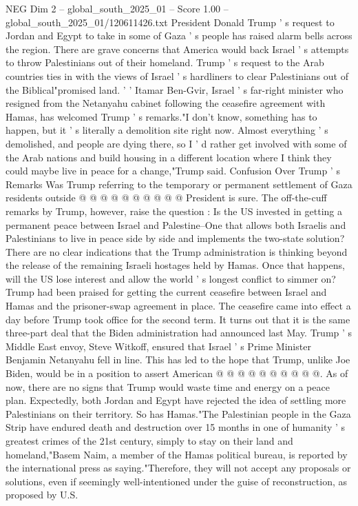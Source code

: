 \begin{textsample}{NEG Dim 2 – global\_south\_2025\_01 – Score 1.00 – global\_south\_2025\_01/120611426.txt}  \label{ex:f2_neg_123}
President Donald Trump ' s request to Jordan and Egypt to take in some of Gaza ' s people has raised alarm bells across the region.
There are grave concerns that America would back Israel ' s attempts to throw Palestinians out of their homeland.
Trump ' s request to the Arab countries ties in with the views of Israel ' s hardliners to clear Palestinians out of the Biblical"promised land. ' ' Itamar Ben-Gvir, Israel ' s far-right minister who resigned from the Netanyahu cabinet following the ceasefire agreement with Hamas, has welcomed Trump ' s remarks."I don't know, something has to happen, but it ' s literally a demolition site right now.
Almost everything ' s demolished, and people are dying there, so I ' d rather get involved with some of the Arab nations and build housing in a different location where I think they could maybe live in peace for a change,"Trump said.
Confusion Over Trump ' s Remarks Was Trump referring to the temporary or permanent settlement of Gaza residents outside @ @ @ @ @ @ @ @ @ @ President is sure.
The off-the-cuff remarks by Trump, however, raise the question : Is the US invested in getting a permanent peace between Israel and Palestine--One that allows both Israelis and Palestinians to live in peace side by side and implements the two-state solution?
There are no clear indications that the Trump administration is thinking beyond the release of the remaining Israeli hostages held by Hamas.
Once that happens, will the US lose interest and allow the world ' s longest conflict to simmer on?
Trump had been praised for getting the current ceasefire between Israel and Hamas and the prisoner-swap agreement in place.
The ceasefire came into effect a day before Trump took office for the second term.
It turns out that it is the same three-part deal that the Biden administration had announced last May.
Trump ' s Middle East envoy, Steve Witkoff, ensured that Israel ' s Prime Minister Benjamin Netanyahu fell in line.
This has led to the hope that Trump, unlike Joe Biden, would be in a position to assert American @ @ @ @ @ @ @ @ @ @.
As of now, there are no signs that Trump would waste time and energy on a peace plan.
Expectedly, both Jordan and Egypt have rejected the idea of settling more Palestinians on their territory.
So has Hamas."The Palestinian people in the Gaza Strip have endured death and destruction over 15 months in one of humanity ' s greatest crimes of the 21st century, simply to stay on their land and homeland,"Basem Naim, a member of the Hamas political bureau, is reported by the international press as saying."Therefore, they will not accept any proposals or solutions, even if seemingly well-intentioned under the guise of reconstruction, as proposed by U.S.

\end{textsample}

